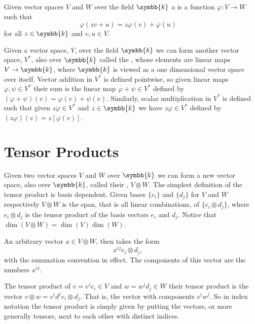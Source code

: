 \documentclass[fleqn]{NotesClass}
\renewcommand{\field}{\symbb{k}}
\newcommand{\dual}[1]{{#1^{*}}}
\begin{document}
\begin{appendices}
        Given vector spaces \(V\) and \(W\) over the field \(\field\) a  is a function \(\varphi \colon V \to W\) such that
        \begin{equation}
            \varphi(zv + u) = z\varphi(v) + \varphi(u)
        \end{equation}
        for all \(z\in \field\) and \(v, u \in V\).
        
        Given a vector space, \(V\), over the field \(\field\) we can form another vector space, \(\dual{V}\), also over \(\field\) called the , whose elements are linear maps \(V \to \field\), where \(\field\) is viewed as a one dimensional vector space over itself.
        Vector addition in \(\dual{V}\) is defined pointwise, so given linear maps \(\varphi, \psi \in \dual{V}\) their sum is the linear map \(\varphi + \psi \in \dual{V}\) defined by \((\varphi + \psi)(v) = \varphi(v) + \psi(v)\).
        Similarly, scalar multiplication in \(\dual{V}\) is defined such that given \(z \varphi \in \dual{V}\) and \(z \in \field\) we have \(z\varphi \in \dual{V}\) defined by \((z\varphi)(v) = z[\varphi(v)]\).
        
        \section{Tensor Products}
        Given two vector spaces \(V\) and \(W\) over \(\field\) we can form a new vector space, also over \(\field\), called their , \(V \otimes W\).
        The simplest definition of the tensor product is basis dependent.
        Given bases \(\{e_i\}\) and \(\{d_j\}\) for \(V\) and \(W\) respectively \(V \otimes W\) is the span, that is all linear combinations, of \(\{e_i \otimes d_j\}\), where \(e_i \otimes d_j\) is the tensor product of the basis vectors \(e_i\) and \(d_j\).
        Notice that \(\dim(V \otimes W) = \dim(V) \dim(W)\).
        
        An arbitrary vector \(x \in V \otimes W\), then takes the form
        \begin{equation}
            x^{ij}e_i \otimes d_j,
        \end{equation}
        with the summation convention in effect.
        The components of this vector are the numbers \(x^{ij}\).
        
        The tensor product of \(v = v^ie_i \in V\) and \(w = w^jd_j \in W\) their tensor product is the vector \(v \otimes w = v^id^j e_i \otimes d_j\).
        That is, the vector with components \(v^iw^j\).
        So in index notation the tensor product is simply given by putting the vectors, or more generally tensors, next to each other with distinct indices.
        

\end{appendices}
\end{document}
